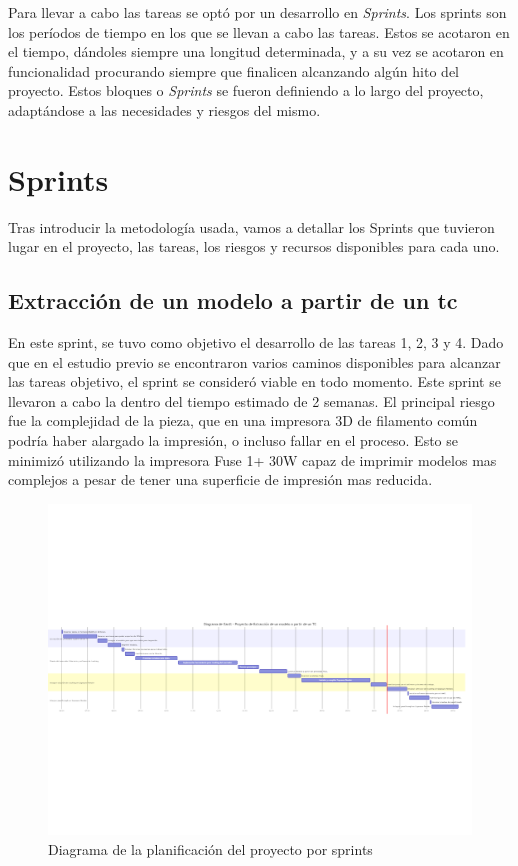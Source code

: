 Para llevar a cabo las tareas se optó por un desarrollo en \textit{Sprints}. Los sprints son los períodos de tiempo en los que se llevan a cabo las tareas. Estos se acotaron en el tiempo, dándoles siempre una longitud determinada, y a su vez se acotaron en funcionalidad procurando siempre que finalicen alcanzando algún hito del proyecto. Estos bloques o \textit{Sprints} se fueron definiendo a lo largo del proyecto, adaptándose a las necesidades y riesgos del mismo.

\section{Sprints}
Tras introducir la metodología usada, vamos a detallar los Sprints que tuvieron lugar en el proyecto, las tareas, los riesgos y recursos disponibles para cada uno.
\subsection{Extracción de un modelo a partir de un \acrshort{tc}}
En este sprint, se tuvo como objetivo el desarrollo de las tareas 1, 2, 3 y 4. Dado que en el estudio previo se encontraron varios caminos disponibles para alcanzar las tareas objetivo, el sprint se consideró viable en todo momento. Este sprint se llevaron a cabo la dentro del tiempo estimado de 2 semanas. El principal riesgo fue la complejidad de la pieza, que en una impresora 3D de filamento común podría haber alargado la impresión, o incluso fallar en el proceso. Esto se minimizó utilizando la impresora Fuse 1+ 30W capaz de imprimir modelos mas complejos a pesar de tener una superficie de impresión mas reducida.

\begin{figure}
  \centering
  \includegraphics[angle=90, height= 1.0\textheight]{imaxes/gantt.png}
  \caption{Diagrama de la planificación del proyecto por sprints}
  \label{fig:sprint1t}
\end{figure}

